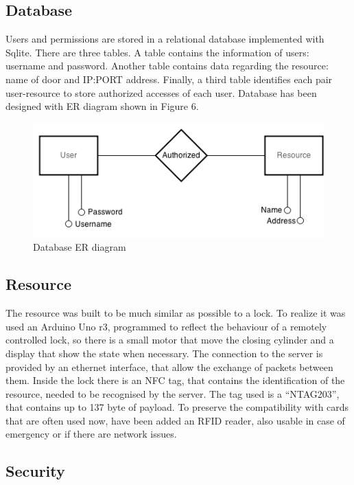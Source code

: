 \documentclass[conference]{IEEEtran}
\begin{document}
\subsection{Database}

Users and permissions are stored in a relational database implemented with Sqlite. There are three tables. A table contains the information of users: username and password. Another table contains data regarding the resource: name of door and IP:PORT address.
Finally, a third table identifies each pair user-resource to store authorized accesses of each user.
Database has been designed with ER diagram shown in Figure 6.

\begin{figure}[h]
\centering
\includegraphics[scale=0.35]{fig6}
\caption{Database ER diagram}
\label{fig_sim}
\end{figure}

\subsection{Resource}

The resource was built to be much similar as possible to a lock. To realize it was used an Arduino Uno r3, programmed to reflect the behaviour of a remotely controlled lock, so there is a small motor that move the closing cylinder and a display that show the state when necessary.
The connection to the server is provided by an ethernet interface, that allow the exchange of packets between them. 
Inside the lock there is an NFC tag, that contains the identification of the resource, needed to be recognised by the server. The tag used is a “NTAG203”, that contains up to 137 byte of payload.
To preserve the compatibility with cards that are often used now, have been added an RFID reader, also usable in case of emergency or if there are network issues.

\subsection{Security}
\end{document}
